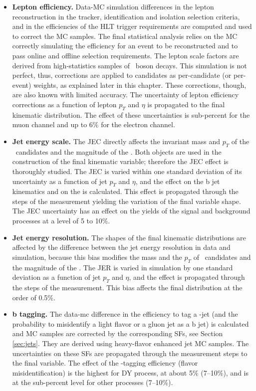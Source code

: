 \begin{itemize}

\item{\bf Lepton efficiency.} 
Data-MC simulation differences in the lepton reconstruction in the tracker, identification and isolation selection criteria, and in the efficiencies of the HLT trigger requirements are computed and used to correct the MC samples. The final statistical analysis relies on the MC correctly simulating the efficiency for an event to be reconstructed and to pass online and offline selection requirements. The lepton scale factors are derived from high-statistics samples of \PZ~boson decays. This simulation is not perfect, thus, corrections are applied to candidates as per-candidate (or per-event) weights, as explained later in this chapter. These corrections, though, are also known with limited accuracy. The uncertainty of lepton efficiency corrections as a function of lepton $p_T$ and $\eta$ is propagated to the final kinematic distribution. The effect of these uncertainties is sub-percent for the muon channel and up to 6\% for the electron channel.

\item{\bf Jet energy scale.}
The JEC directly affects the invariant mass and $p_T$ of the \HBB~candidates and the magnitude of the \PTslash. Both objects are used in the construction of the final kinematic variable; therefore the JEC effect is thoroughly studied. The JEC is varied within one standard deviation of its uncertainty as a function of jet $p_T$ and $\eta$, and the effect on the b jet kinematics and on the \PTslash is calculated. This effect is propagated through the steps of the measurement yielding the variation of the final variable shape. The JEC uncertainty has an effect on the yields of the signal and background processes at a level of 5 to 10\%.

\item{\bf Jet energy resolution.} 
The shapes of the final kinematic distributions are affected by the difference between the jet energy
resolution in data and simulation, because this bias modifies the mass and the $p_T$ of \HBB~candidates and the magnitude of the \PTslash. The JER is varied in simulation by one standard deviation as a function of jet $p_T$ and $\eta$, and the effect is propagated through the steps of the measurement. This bias affects the final distribution at the order of 0.5\%.

\item{\bf b tagging.}
The data-mc difference in the efficiency to tag a \PQb-jet (and the probability to misidentify a light flavor or a gluon jet as a b jet) is calculated and MC samples are corrected by the corresponding SFs, see Section \ref{sec:jets}. They are derived using heavy-flavor enhanced jet MC samples. The uncertainties on these SFs are propagated through the measurement steps to the final variable. The effect of the \PQb-tagging efficiency (flavor misidentification) is the highest for DY process, at about 5\% (7--10\%), and is at the sub-percent level for other processes (7--10\%). 


\end{itemize}
